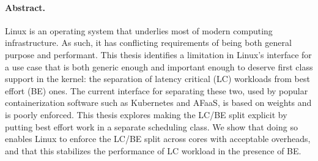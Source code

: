 \paragraph{Abstract.}

Linux is an operating system that underlies most of modern computing
infrastructure. As such, it has conflicting requirements of being both general
purpose and performant. This thesis identifies a limitation in Linux's interface
for a use case that is both generic enough and important enough to deserve first
class support in the kernel: the separation of latency critical (LC) workloads
from best effort (BE) ones. The current interface for separating these two, used
by popular containerization software such as Kubernetes and AFaaS, is based on
weights and is poorly enforced. This thesis explores making the LC/BE split
explicit by putting best effort work in a separate scheduling class. We show
that doing so enables Linux to enforce the LC/BE split across cores with
acceptable overheads, and that this stabilizes the performance of LC workload in
the presence of BE.
